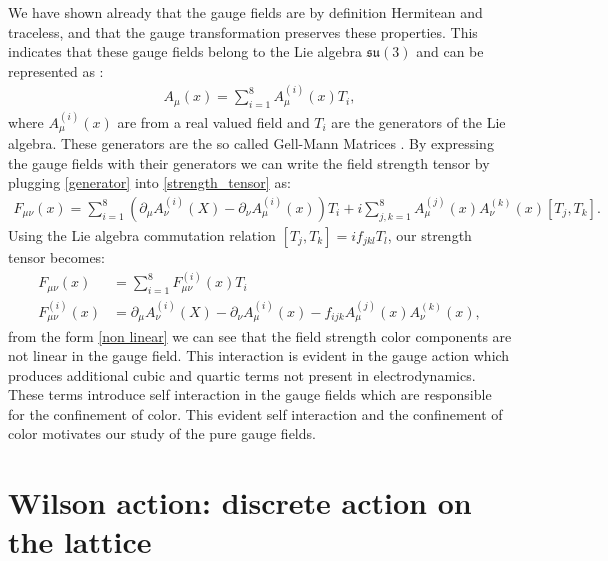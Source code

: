 \documentclass[english,twoside,openright]{UH_TCM_MSc}
\begin{document}
We have shown already that the gauge fields are by definition Hermitean and traceless, and that the gauge transformation preserves these properties. This indicates that these gauge fields belong to the Lie algebra $\mathfrak{su}(3)$ and can be represented as \cite[ch. 2]{Georgi:1982jb}:
\begin{align}
    A_\mu(x) = \sum_{i=1}^8 A^{(i)}_\mu(x) T_i, \label{generator}
\end{align}
where $ A^{(i)}_\mu(x)$ are from a real valued field and $T_i$ are the generators of the Lie algebra. These generators are the so called Gell-Mann Matrices \cite[ch. 7]{Georgi:1982jb}. By expressing the gauge fields with their generators we can write the field strength tensor by plugging \ref{generator} into \ref{strength_tensor} as:
\begin{align}
    F_{\mu\nu}(x) = \sum_{i=1}^8\left(\partial_\mu A_\nu^{(i)}(X) - \partial_\nu A_\mu^{(i)}(x)\right)T_i + i\sum_{j,k=1}^{8} A_{\mu}^{(j)}(x)A_{\nu}^{(k)}(x)[T_j,T_k].
\end{align}
Using the Lie algebra commutation relation $[T_j,T_k] = if_{jkl}T_l$, our strength tensor becomes:
\begin{align}
    F_{\mu\nu}(x) &= \sum_{i=1}^{8} F_{\mu\nu}^{(i)}(x) T_i \\
     F_{\mu\nu}^{(i)}(x) &= \partial_\mu A_\nu^{(i)}(X) - \partial_\nu A_\mu^{(i)}(x) - f_{ijk}A_\mu^{(j)}(x)A^{(k)}_\nu(x), \label{non linear}
\end{align}
from the form \ref{non linear} we can see that the field strength color components are not linear in the gauge field. This interaction is evident in the gauge action which produces additional cubic and quartic terms not present in electrodynamics. These terms introduce self interaction in the gauge fields which are responsible for the confinement of color. This evident self interaction and the confinement of color motivates our study of the pure gauge fields.

\section{Wilson action: discrete action on the lattice}
\end{document}
